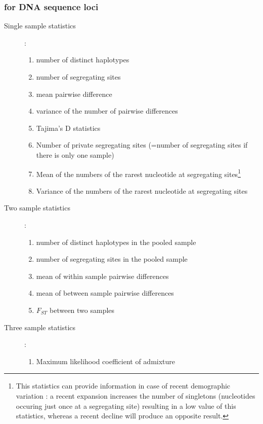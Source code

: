\subsubsection{for DNA sequence loci}

\begin{description}
\item[Single sample statistics] : 
\begin{enumerate}
  \item number of distinct haplotypes 
  \item number of segregating sites
  \item mean pairwise difference
  \item variance of the number of pairwise differences
  \item Tajima's D statistics \citep{TA1989}
  \item Number of private segregating sites (=number of segregating sites if there is only one sample)
  \item Mean of the numbers of the rarest nucleotide at segregating sites\footnote{This statistics can provide information in case of recent demographic variation : a recent expansion increases the number of singletons (nucleotides occuring just once at a segregating site) resulting in a low value of this statistics, whereas a recent decline will produce an opposite result.}
  \item Variance of the numbers of the rarest nucleotide at segregating sites
 \end{enumerate}
\item[Two sample statistics] :
\begin{enumerate}
  \item number of distinct haplotypes in the pooled sample
  \item number of segregating sites in the pooled sample
  \item mean of within sample pairwise differences
  \item mean of between sample pairwise differences
  \item $F_{ST}$ between two samples \citep{H1992}
  \end{enumerate}
\item[Three sample statistics] :
\begin{enumerate}
  \item Maximum likelihood coefficient of admixture  \citep[adapted from][]{CF2004}
\end{enumerate}
\end{description}

